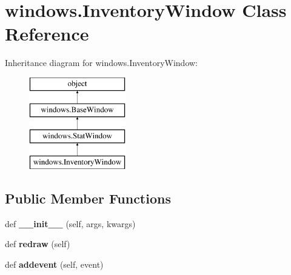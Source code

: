 \hypertarget{classwindows_1_1_inventory_window}{}\section{windows.\+Inventory\+Window Class Reference}
\label{classwindows_1_1_inventory_window}
Inheritance diagram for windows.\+Inventory\+Window\+:\begin{figure}[H]
\begin{center}
\leavevmode
\includegraphics[height=4.000000cm]{classwindows_1_1_inventory_window}
\end{center}
\end{figure}
\subsection*{Public Member Functions}
\begin{DoxyCompactItemize}
\item 
\hypertarget{classwindows_1_1_inventory_window_abb6f5bb749e6f0bcb070e0df81d0c1f6}{}def {\bfseries \+\_\+\+\_\+init\+\_\+\+\_\+} (self, args, kwargs)\label{classwindows_1_1_inventory_window_abb6f5bb749e6f0bcb070e0df81d0c1f6}

\item 
\hypertarget{classwindows_1_1_inventory_window_ab4de4bb1d71f5a31553abf37323c73aa}{}def {\bfseries redraw} (self)\label{classwindows_1_1_inventory_window_ab4de4bb1d71f5a31553abf37323c73aa}

\item 
\hypertarget{classwindows_1_1_inventory_window_a308989f8e51bcc48471c0bf54f7c1e8f}{}def {\bfseries addevent} (self, event)\label{classwindows_1_1_inventory_window_a308989f8e51bcc48471c0bf54f7c1e8f}

\end{DoxyCompactItemize}
